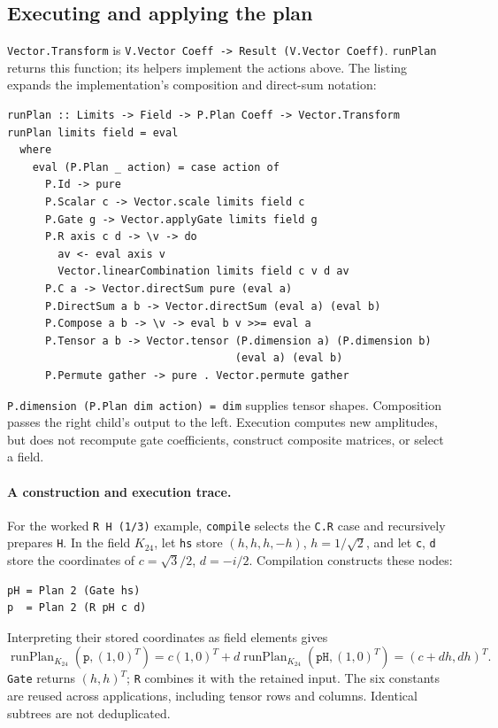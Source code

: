 \documentclass[11pt,a4paper]{article}
\newcommand{\code}[1]{\texttt{#1}}
\begin{document}
\subsection{Executing and applying the plan}
\code{Vector.Transform} is \code{V.Vector Coeff -> Result (V.Vector Coeff)}.
\code{runPlan} returns this function; its helpers implement the actions
above. The listing expands the implementation's composition and direct-sum notation:
\begin{lstlisting}[label=lst:plan-run]
runPlan :: Limits -> Field -> P.Plan Coeff -> Vector.Transform
runPlan limits field = eval
  where
    eval (P.Plan _ action) = case action of
      P.Id -> pure
      P.Scalar c -> Vector.scale limits field c
      P.Gate g -> Vector.applyGate limits field g
      P.R axis c d -> \v -> do
        av <- eval axis v
        Vector.linearCombination limits field c v d av
      P.C a -> Vector.directSum pure (eval a)
      P.DirectSum a b -> Vector.directSum (eval a) (eval b)
      P.Compose a b -> \v -> eval b v >>= eval a
      P.Tensor a b -> Vector.tensor (P.dimension a) (P.dimension b)
                                    (eval a) (eval b)
      P.Permute gather -> pure . Vector.permute gather
\end{lstlisting}
\code{P.dimension (P.Plan dim action) = dim} supplies tensor shapes.
Composition passes the right child's output to the left. Execution
computes new amplitudes, but does not recompute gate coefficients,
construct composite matrices, or select a field.

\paragraph{A construction and execution trace.}
For the worked \code{R H (1/3)} example, \code{compile} selects the
\code{C.R} case and recursively prepares \code{H}. In the field $K_{24}$,
let \code{hs} store $(h,h,h,-h)$, $h=1/\sqrt2$, and let
\code{c}, \code{d} store the coordinates of $c=\sqrt3/2$, $d=-i/2$.
Compilation constructs these nodes:
\begin{lstlisting}
pH = Plan 2 (Gate hs)
p  = Plan 2 (R pH c d)
\end{lstlisting}
Interpreting their stored coordinates as field elements gives
\[
\operatorname{runPlan}_{K_{24}}(\code p,(1,0)^T)
=c(1,0)^T+d\operatorname{runPlan}_{K_{24}}(\code{pH},(1,0)^T)
=(c+dh,dh)^T.
\]
\code{Gate} returns $(h,h)^T$; \code{R} combines it with the retained input.
The six constants are reused across applications, including tensor rows
and columns. Identical subtrees are not deduplicated.
\end{document}
